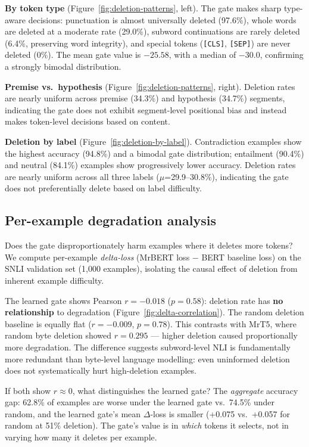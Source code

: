 \documentclass{article} %
\begin{document}
\textbf{By token type} (Figure~\ref{fig:deletion-patterns}, left). The gate makes sharp type-aware decisions: punctuation is almost universally deleted (97.6\%), whole words are deleted at a moderate rate (29.0\%), subword continuations are rarely deleted (6.4\%, preserving word integrity), and special tokens (\texttt{[CLS]}, \texttt{[SEP]}) are never deleted (0\%). The mean gate value is $-25.58$, with a median of $-30.0$, confirming a strongly bimodal distribution.

\textbf{Premise vs.\ hypothesis} (Figure~\ref{fig:deletion-patterns}, right). Deletion rates are nearly uniform across premise (34.3\%) and hypothesis (34.7\%) segments, indicating the gate does not exhibit segment-level positional bias and instead makes token-level decisions based on content.

\textbf{Deletion by label} (Figure~\ref{fig:deletion-by-label}). Contradiction examples show the highest accuracy (94.8\%) and a bimodal gate distribution; entailment (90.4\%) and neutral (84.1\%) examples show progressively lower accuracy. Deletion rates are nearly uniform across all three labels ($\mu$=29.9--30.8\%), indicating the gate does not preferentially delete based on label difficulty.


\subsection{Per-example degradation analysis}
\label{sec:loss-deletion-correlation}

Does the gate disproportionately harm examples where it deletes more tokens? We compute per-example \emph{delta-loss} (MrBERT loss $-$ BERT baseline loss) on the SNLI validation set (1,000 examples), isolating the causal effect of deletion from inherent example difficulty.

The learned gate shows Pearson $r=-0.018$ ($p=0.58$): deletion rate has \textbf{no relationship} to degradation (Figure~\ref{fig:delta-correlation}). The random deletion baseline is equally flat ($r=-0.009$, $p=0.78$). This contrasts with MrT5, where random byte deletion showed $r=0.295$ --- higher deletion caused proportionally more degradation. The difference suggests subword-level NLI is fundamentally more redundant than byte-level language modelling: even uninformed deletion does not systematically hurt high-deletion examples.

If both show $r\approx0$, what distinguishes the learned gate? The \emph{aggregate} accuracy gap: 62.8\% of examples are worse under the learned gate vs.\ 74.5\% under random, and the learned gate's mean $\Delta$-loss is smaller (+0.075 vs.\ +0.057 for random at 51\% deletion). The gate's value is in \emph{which} tokens it selects, not in varying how many it deletes per example.
\end{document}

